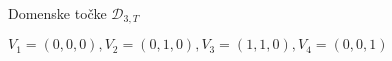 \documentclass{beamer}
\begin{document}
\begin{frame}{Domenske točke $\mathcal{D}_{3,T}$}
\begin{tikzpicture}[scale=3, z={(0.6cm,2cm)}]
    \end{tikzpicture}
    $V_1 = (0, 0, 0), V_2 =(0,1, 0), V_3 = (1,1,0), V_4 = (0,0,1) $
\end{frame}



\end{document}
